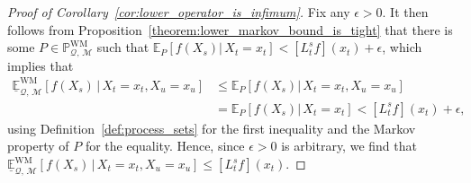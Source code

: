 \documentclass[10pt,a4paper]{paper}
\theoremstyle{definition}
\newcommand{\reals}{\mathbb{R}}
\newcommand{\realspos}{\reals_{>0}}
\newcommand{\processes}{\mathbb{P}}
\newcommand{\wprocesses}{\processes^{\mathrm{W}}}
\newcommand{\wmprocesses}{\processes^{\mathrm{WM}}}
\newcommand{\rateset}{\mathcal{Q}}
\newcommand{\norm}[1]{\left\lVert #1 \right\rVert}
\begin{document}
\begin{proof}[Proof of Corollary~\ref{cor:lower_operator_is_infimum}]
Fix any $\epsilon>0$.
It then follows from Proposition~\ref{theorem:lower_markov_bound_is_tight} that there is some $P\in\wmprocesses_{\rateset,\,\mathcal{M}}$ such that $\mathbb{E}_P[f(X_s)\vert\,X_t=x_t] < [L_t^sf](x_t)+\epsilon$, which implies that
\begin{align*}
\underline{\mathbb{E}}^{\mathrm{WM}}_{\rateset,\,\mathcal{M}}\left[f(X_s)\,\vert\,X_t=x_t,X_u=x_u\right]
&\leq
\mathbb{E}_P[f(X_s)\vert\,X_t=x_t,X_u=x_u]\\
&=\mathbb{E}_P[f(X_s)\vert\,X_t=x_t]
< [L_t^sf](x_t)+\epsilon,
\end{align*}
using Definition~\ref{def:process_sets} for the first inequality and the Markov property of $P$ for the equality. Hence, since $\epsilon>0$ is arbitrary, we find that  $\underline{\mathbb{E}}^{\mathrm{WM}}_{\rateset,\,\mathcal{M}}\left[f(X_s)\,\vert\,X_t=x_t,X_u=x_u\right]\leq[L_t^sf](x_t)$.

\end{proof}
\end{document}
